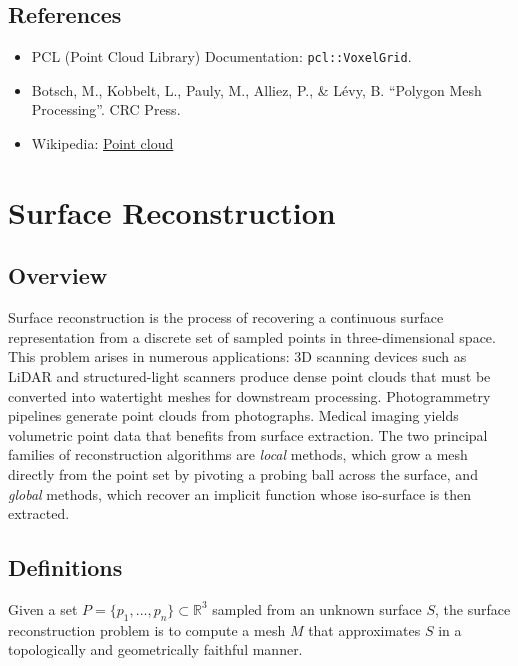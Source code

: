 \subsection{References}
\begin{itemize}
\item PCL (Point Cloud Library) Documentation: \texttt{pcl::VoxelGrid}.
\item Botsch, M., Kobbelt, L., Pauly, M., Alliez, P., \& L\'evy, B. \cite{botsch2010} ``Polygon Mesh Processing''. CRC Press.
\item Wikipedia: \href{https://en.wikipedia.org/wiki/Point_cloud}{Point cloud}
\end{itemize}

\section{Surface Reconstruction}
\label{sec:surface_reconstruction}

\subsection{Overview}
Surface reconstruction is the process of recovering a continuous surface representation from a discrete set of sampled points in three-dimensional space. This problem arises in numerous applications: 3D scanning devices such as LiDAR and structured-light scanners produce dense point clouds that must be converted into watertight meshes for downstream processing. Photogrammetry pipelines generate point clouds from photographs. Medical imaging yields volumetric point data that benefits from surface extraction. The two principal families of reconstruction algorithms are \emph{local} methods, which grow a mesh directly from the point set by pivoting a probing ball across the surface, and \emph{global} methods, which recover an implicit function whose iso-surface is then extracted.

\subsection{Definitions}
\begin{definition}\label{def:surface_reconstruction}
Given a set $P = \{p_1, \ldots, p_n\} \subset \mathbb{R}^3$ sampled from an unknown surface $S$, the surface reconstruction problem is to compute a mesh $M$ that approximates $S$ in a topologically and geometrically faithful manner.
\end{definition}

